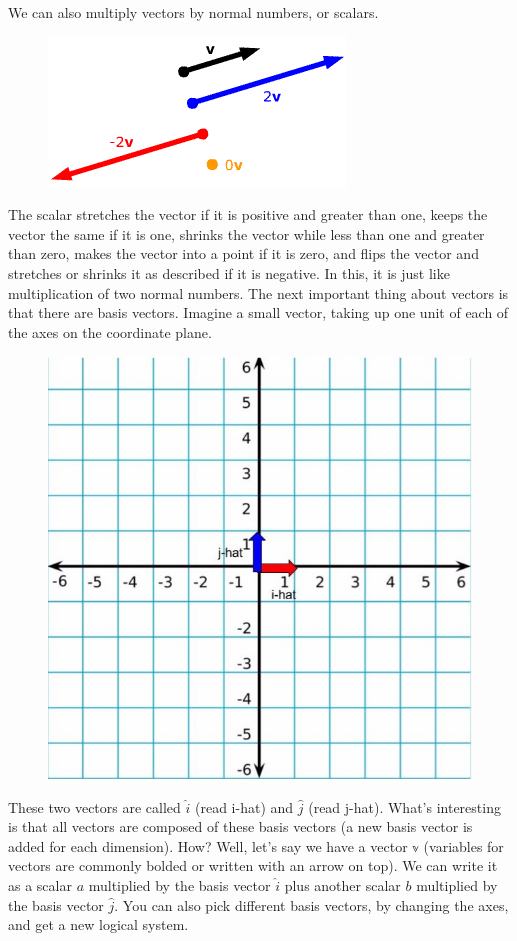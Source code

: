 We can also multiply vectors by normal numbers, or scalars. 
\begin{figure}[H]
\includegraphics{mult2.png}
\end{figure}
The scalar stretches the vector if it is positive and greater than one, keeps the vector the same if it is one, shrinks the vector while less than one and greater than zero, makes the vector into a point if it is zero, and flips the vector and stretches or shrinks it as described if it is negative.
In this, it is just like multiplication of two normal numbers. The next important thing about vectors is that there are basis vectors. Imagine a small vector, taking up one unit of each of the axes on the coordinate plane. 
\begin{figure}[H]
\includegraphics{basis.jpg}
\end{figure}
These two vectors are called $\hat{i}$ (read i-hat) and $\hat{j}$ (read j-hat). What's interesting is that all vectors are composed of these basis vectors (a new basis vector is added for each dimension). How? Well, let's say we have a vector $\mathbb{v}$ (variables for vectors are commonly bolded or written with an arrow on top). We can write it as a scalar $a$ multiplied by the basis vector $\hat{i}$ plus another scalar $b$ multiplied by the basis vector $\hat{j}$. You can also pick different basis vectors, by changing the axes, and get a new logical system.
